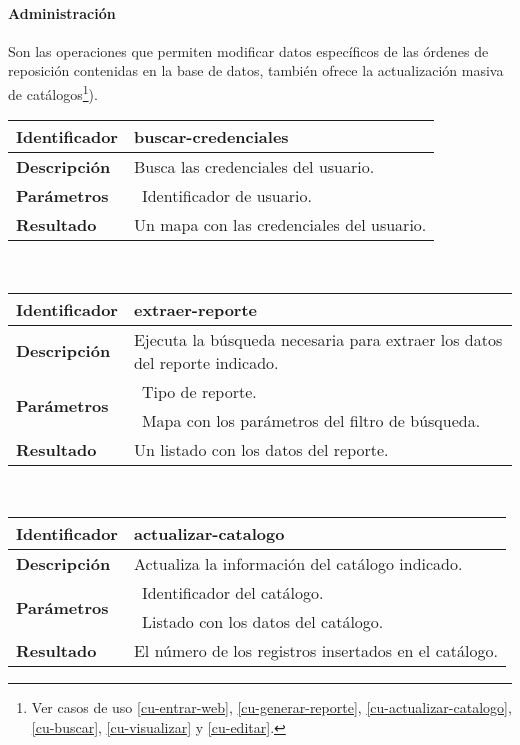 \paragraph{Administración\\}
Son las operaciones que permiten modificar datos específicos de las órdenes de reposición contenidas en la base de datos, también ofrece la actualización masiva de catálogos\footnote{Ver casos de uso \ref{cu-entrar-web}, \ref{cu-generar-reporte}, \ref{cu-actualizar-catalogo}, \ref{cu-buscar}, \ref{cu-visualizar} y \ref{cu-editar}.}).
	\vspace{5mm}\\
	\begin{tabular}{|p{}|p{}|}
		\hline
		\textbf{Identificador}	& \textbf{buscar-credenciales}\\
		\hline
		\hline
		\textbf{Descripción}	& Busca las credenciales del usuario.\\
		\hline
		\textbf{Parámetros}		& \textbullet\, Identificador de usuario.\\
		\hline
		\textbf{Resultado}		& Un mapa con las credenciales del usuario.\\
		\hline
	\end{tabular}
	\vspace{5mm}\\
	\begin{tabular}{|p{}|p{}|}
		\hline
		\textbf{Identificador}	& \textbf{extraer-reporte}\\
		\hline
		\hline
		\textbf{Descripción}	& Ejecuta la búsqueda necesaria para extraer los datos del reporte indicado.\\
		\hline
		\multirow{2}{*}{\textbf{Parámetros}}	& \textbullet\, Tipo de reporte.\\
												& \textbullet\, Mapa con los parámetros del filtro de búsqueda.\\
		\hline
		\textbf{Resultado}		& Un listado con los datos del reporte.\\
		\hline
	\end{tabular}
	\vspace{5mm}\\
	\begin{tabular}{|p{}|p{}|}
		\hline
		\textbf{Identificador}	& \textbf{actualizar-catalogo}\\
		\hline
		\hline
		\textbf{Descripción}	& Actualiza la información del catálogo indicado.\\
		\hline
		\multirow{2}{*}{\textbf{Parámetros}}	& \textbullet\, Identificador del catálogo.\\
												& \textbullet\, Listado con los datos del catálogo.\\
		\hline
		\textbf{Resultado}		& El número de los registros insertados en el catálogo.\\
		\hline
	\end{tabular}
